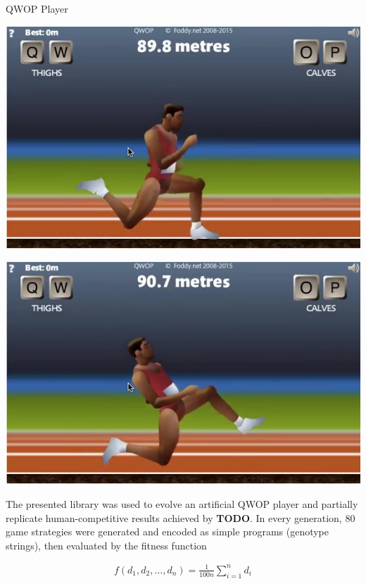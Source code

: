 \documentclass[a0paper,portrait]{baposter}
\newcommand*{\todo}{\textbf{TODO}}
\begin{document}
\begin{poster}
\begin{posterbox}[name=qwop,column=2]{QWOP Player}
	\parbox[c]{0.49\linewidth}{\includegraphics[width=\linewidth]{runner1}}
	\hfill
	\parbox[c]{0.49\linewidth}{\includegraphics[width=\linewidth]{runner2}}

	\vspace{0.5em}

	The presented library was used to evolve an artificial QWOP player and partially replicate human-competitive results achieved by \todo. In every generation, 80 game strategies were generated and encoded as simple programs (genotype strings), then evaluated by the fitness function

	\vspace{-1.7em}

	\begin{align*}
		f(d_1,d_2,\dots,d_n) = \frac{1}{100n} \sum_{i=1}^n d_i
	\end{align*}

	\vspace{-0.5em}


\end{posterbox}
\end{poster}
\end{document}
